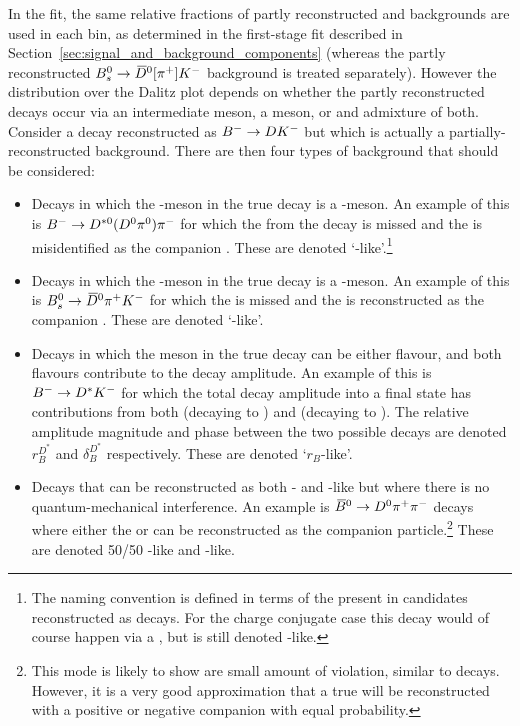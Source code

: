In the \CP fit, the same relative fractions of partly reconstructed \Bpm and \Bz backgrounds are used in each bin, as determined in the first-stage fit described in Section~\ref{sec:signal_and_background_components} (whereas the partly reconstructed ${{B}^0_{s}}\rightarrow{\ensuremath{{\kern 0.18em\overline{\kern -0.18em D}}{}^0}}[\pi^+]K^-$ background is treated separately). However the distribution over the Dalitz plot depends on whether the partly reconstructed decays occur via an intermediate \Dz meson, a \Dzb meson, or and admixture of both. Consider a decay reconstructed as ${{{B}^-}}\rightarrow{\ensuremath{D}}{\ensuremath{{K}^-}}$ but which is actually a partially-reconstructed background. There are then four types of background that should be considered:
\begin{itemize}
\item Decays in which the \PD-meson in the true decay is a \Dz-meson. An example of this is ${{{B}^-}}\rightarrow{\ensuremath{{D}^{*0}}}({{D}^0}{{\pi}^0}){{\pi}^-}$ for which the \piz from the \Dstarz decay is missed and the \pim is misidentified as the companion \Km. These are denoted `\Dz-like'.\footnote{The naming convention is defined in terms of the \D present in candidates reconstructed as \Bm decays. For the charge conjugate case this decay would of course happen via a \Dzb, but is still denoted \Dz-like.}

\item Decays in which the \PD-meson in the true decay is a \Dzb-meson. An example of this is ${{B}^0_{s}}\rightarrow{\ensuremath{{\kern 0.18em\overline{\kern -0.18em D}}{}^0}}{\ensuremath{{\pi}^+}}{\ensuremath{{K}^-}}$ for which the \pip is missed and the \Km is reconstructed as the companion \Km. These are denoted `\Dzb-like'.

\item Decays in which the \PD meson in the true decay can be either flavour, and both \D flavours contribute to the decay amplitude. An example of this is ${{{B}^-}}\rightarrow{\ensuremath{{D}^*}}{\ensuremath{{K}^-}}$ for which the total decay amplitude into a \D final state has contributions from both \Dstarz (decaying to \Dz) and \Dstarzb (decaying to \Dzb). The relative amplitude magnitude and phase between the two possible \PB decays are denoted $r_{B}^{D^*}$ and $\delta_{B}^{D^*}$ respectively. These are denoted  `$r_B$-like'. %

\item Decays that can be reconstructed as both \Dz- and \Dzb-like but where there is no quantum-mechanical interference. An example is ${{\kern 0.18em\overline{\kern -0.18em B}}{}^0}\rightarrow{\ensuremath{{D}^0}}{\ensuremath{{\pi}^+}}{\ensuremath{{\pi}^-}}$ decays where either the \pip or \pim can be reconstructed as the companion particle.\footnote{This mode is likely to show are small amount of \CP violation, similar to \BtoDpi decays. However, it is a very good approximation that a true \Dz will be reconstructed with a positive or negative companion with equal probability.} These are denoted 50/50 \Dz-like and \Dzb-like. 

\end{itemize}
